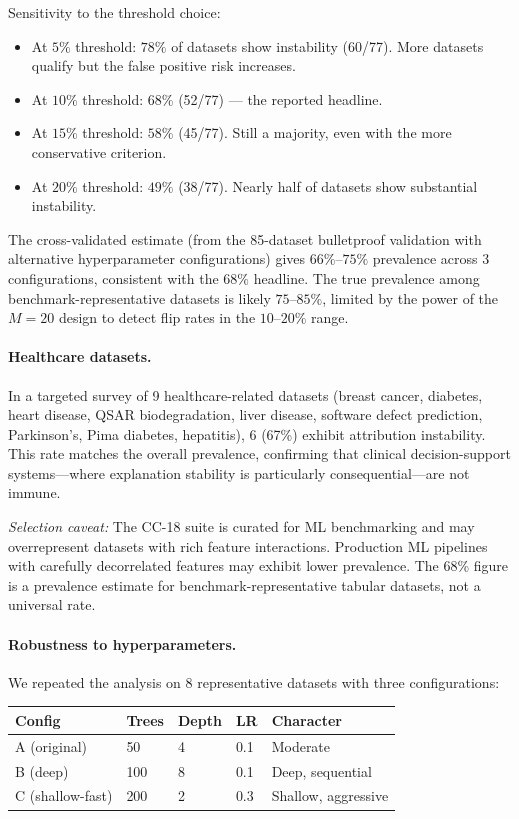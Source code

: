\documentclass{article}
\begin{document}
\noindent Sensitivity to the threshold choice:
\begin{itemize}
\item At $5\%$ threshold: $78\%$ of datasets show instability (60/77). More datasets qualify but the false positive risk increases.
\item At $10\%$ threshold: $68\%$ (52/77) --- the reported headline.
\item At $15\%$ threshold: $58\%$ (45/77). Still a majority, even with the more conservative criterion.
\item At $20\%$ threshold: $49\%$ (38/77). Nearly half of datasets show substantial instability.
\end{itemize}

\noindent The cross-validated estimate (from the 85-dataset bulletproof validation with alternative hyperparameter configurations) gives $66\%$--$75\%$ prevalence across 3 configurations, consistent with the $68\%$ headline. The true prevalence among benchmark-representative datasets is likely $75$--$85\%$, limited by the power of the $M{=}20$ design to detect flip rates in the $10$--$20\%$ range.

\paragraph{Healthcare datasets.}
In a targeted survey of 9 healthcare-related datasets (breast cancer, diabetes, heart disease, QSAR biodegradation, liver disease, software defect prediction, Parkinson's, Pima diabetes, hepatitis), 6 (67\%) exhibit attribution instability. This rate matches the overall prevalence, confirming that clinical decision-support systems---where explanation stability is particularly consequential---are not immune.

\emph{Selection caveat:} The CC-18 suite is curated for ML benchmarking and may overrepresent datasets with rich feature interactions. Production ML pipelines with carefully decorrelated features may exhibit lower prevalence. The 68\% figure is a prevalence estimate for benchmark-representative tabular datasets, not a universal rate.

\paragraph{Robustness to hyperparameters.}
We repeated the analysis on 8 representative datasets with three configurations:

\begin{center}
\small
\begin{tabular}{@{}lllll@{}}
\toprule
Config & Trees & Depth & LR & Character \\
\midrule
A (original) & 50 & 4 & 0.1 & Moderate \\
B (deep) & 100 & 8 & 0.1 & Deep, sequential \\
C (shallow-fast) & 200 & 2 & 0.3 & Shallow, aggressive \\
\bottomrule
\end{tabular}
\end{center}
\end{document}
